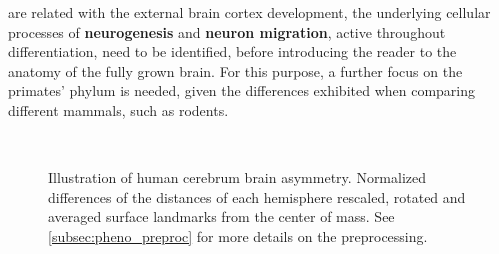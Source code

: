 are related with the external brain cortex development, the underlying cellular processes of \textbf{neurogenesis} and  \textbf{neuron migration}, active throughout differentiation, need to be identified, before introducing the reader to the anatomy of the fully grown brain. For this purpose, a further focus on the primates' phylum is needed, given the differences exhibited when comparing different mammals, such as rodents\cite{Molnar2019}.
 


\begin{figure}[H]
	\centering
	\\
	\caption[Human cerebrum brain asymmetry]{Illustration of human cerebrum brain asymmetry. Normalized differences of the distances of each hemisphere rescaled, rotated and averaged surface landmarks from the center of mass. See \autoref{subsec:pheno_preproc} for more details on the preprocessing.}
	\label{fig:brainlat}
\end{figure}

